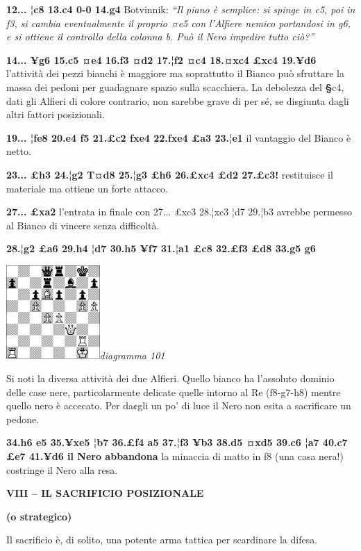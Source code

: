 \documentclass[
]{article}
\begin{document}
\textbf{12... ¦c8 13.c4 0-0 14.g4} Botvinnik: \emph{``Il piano è
semplice: si spinge in c5, poi in f3, si cambia eventualmente il proprio
¤e5 con l'Alfiere nemico portandosi in g6, e si ottiene il controllo
della colonna b. Può il Nero impedire tutto ciò?''}

\textbf{14... ¥g6 15.c5 ¤e4 16.f3 ¤d2 17.¦f2 ¤c4 18.¤xc4 £xc4 19.¥d6}
l'attività dei pezzi bianchi è maggiore ma soprattutto il Bianco può
sfruttare la massa dei pedoni per guadagnare spazio sulla scacchiera. La
debolezza del \textbf{§}c4, dati gli Alfieri di colore contrario, non
sarebbe grave di per sé, se disgiunta dagli altri fattori posizionali.

\textbf{19... ¦fe8 20.e4 f5 21.£c2 fxe4 22.fxe4 £a3 23.¦e1} il vantaggio
del Bianco è netto.

\textbf{23... £h3 24.¦g2 T¤d8 25.¦g3 £h6 26.£xc4 £d2 27.£c3!}
restituisce il materiale ma ottiene un forte attacco.

\textbf{27... £xa2} l'entrata in finale con 27... £xc3 28.¦xc3 ¦d7
29.¦b3 avrebbe permesso al Bianco di vincere senza difficoltà.

\textbf{28.¦g2 £a6 29.h4 ¦d7 30.h5 ¥f7 31.¦a1 £c8 32.£f3 £d8 33.g5 g6}

\includegraphics[width=1.40139in,height=1.40139in]{vertopal_109f12be458a423d8f3cc838880eaea2/media/image101.png}\emph{diagramma
101}

Si noti la diversa attività dei due Alfieri. Quello bianco ha l'assoluto
dominio delle case nere, particolarmente delicate quelle intorno al Re
(f8-g7-h8) mentre quello nero è accecato. Per da¢gli un po' di luce il
Nero non esita a sacrificare un pedone.

\textbf{34.h6 e5 35.¥xe5 ¦b7 36.£f4 a5 37.¦f3 ¥b3 38.d5 ¤xd5 39.c6 ¦a7
40.c7 £e7 41.¥d6 il Nero abbandona} la minaccia di matto in f8 (una casa
nera!) costringe il Nero alla resa.

\textbf{VIII -- IL SACRIFICIO POSIZIONALE}

\textbf{(o strategico)}

Il sacrificio è, di solito, una potente arma tattica per scardinare la
difesa.
\end{document}
